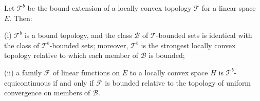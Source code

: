 Let $\mathcal{T}^b$ be the bound extension of a locally convex topology $\mathcal{T}$ for a linear space $E$. Then:

(i) $\mathcal{T}^b$ is a bound topology, and the class $\mathcal{B}$ of $\mathcal{T}$-bounded sets is identical with the class of $\mathcal{T}^b$-bounded sets; moreover, $\mathcal{T}^b$ is the strongest locally convex topology relative to which each member of $\mathcal{B}$ is bounded;

(ii) a family $\mathcal{F}$ of linear functions on $E$ to a locally convex space $H$ is $\mathcal{T}^b$-equicontinuous if and only if $\mathcal{F}$ is bounded relative to the topology of uniform convergence on members of $\mathcal{B}$.
